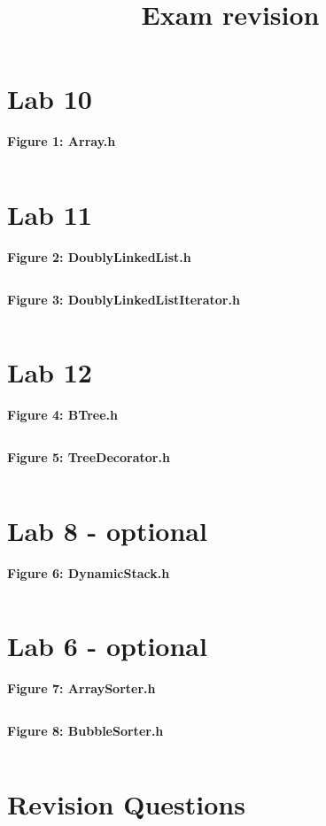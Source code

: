 \documentclass[11pt, letterpaper]{article}
\title{Exam revision}
\author{}
\date{}
\newcommand{\includeminted}[3]
{
  \begin{center}
  \textbf{#1}
  \vspace{-5pt}
  \inputminted[linenos, breaklines]{#2}{#3}
  \end{center}
}
\begin{document}
\normalsize
\section{Lab 10}
\includeminted{Figure 1: Array.h}{cpp}{../10/src/Array.h}
\clearpage
\section{Lab 11}
\includeminted{Figure 2: DoublyLinkedList.h}{cpp}{../11/src/DoublyLinkedList.h}
\clearpage
\includeminted{Figure 3: DoublyLinkedListIterator.h}{cpp}{../11/src/DoublyLinkedListIterator.h}
\clearpage
\section{Lab 12}
\includeminted{Figure 4: BTree.h}{cpp}{../12/src/BTree.h}
\clearpage
\includeminted{Figure 5: TreeDecorator.h}{cpp}{../12/src/TreeDecorator.h}
\clearpage
\section{Lab 8 - optional}
\includeminted{Figure 6: DynamicStack.h}{cpp}{../8/src/DynamicStack.h}
\clearpage
\section{Lab 6 - optional}
\includeminted{Figure 7: ArraySorter.h}{cpp}{../6/src/ArraySorter.h}
\clearpage
\includeminted{Figure 8: BubbleSorter.h}{cpp}{../6/src/BubbleSorter.h}
\clearpage
\section*{Revision Questions}
\setlength{\parskip}{0.5em}

\end{document}
